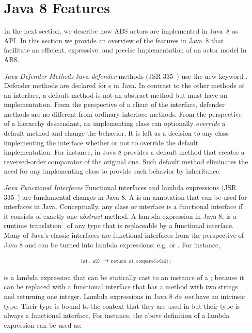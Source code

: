 \section{Java 8 Features}
\label{ch03:sec:j8:features}

In the next section, we describe how ABS actors are implemented in Java~8 as API.
In this section we provide an overview of the features in Java~8 that facilitate an efficient, expressive, and precise implementation of an actor model
in ABS.

\textsl{Java Defender Methods}
Java \emph{defender} methods (JSR 335~\cite{jsr335}) use the new keyword . 
Defender methods are declared for s in Java. 
In contrast to the other methods of an interface, a default method is not an abstract method but  must have an implementation.
From the perspective of a client of the interface, defender methods are no different from ordinary interface methods.
From the perspective of a hierarchy descendant, an implementing class can optionally \textit{override} a default method and change the behavior.
It is left as a decision to any class implementing the interface whether or not to override the default implementation.
For instance, in Java 8  provides a default method  that creates a reversed-order comparator of the original one.
Such default method eliminates the need for any implementing class to provide such behavior by inheritance.

\textsl{Java Functional Interfaces}
Functional interfaces and lambda expressions (JSR 335~\cite{jsr335}) are fundamental changes in Java 8. 
A  is an annotation that can be used for interfaces in Java.
Conceptually, any class or interface is a functional interface if it consists of exactly one \emph{abstract} method.
A lambda expression in Java 8, is a runtime translation~\cite{jsr335:lambda:translation} of any type that is replaceable by a functional interface.
Many of Java's classic interfaces are functional interfaces from the perspective of Java 8 and can be turned into lambda expressions; 
e.g.  or .
For instance,

$$
{\scriptsize\texttt{(s1, s2)}} \to {\scriptsize\texttt{return s1.compareTo(s2);}}
$$

is a lambda expression that can be statically cast to an instance of a ;
because it can be replaced with a functional interface that has a method with two strings and returning one integer.
Lambda expressions in Java 8 \emph{do not} have an intrinsic type.
Their type is bound to the context that they are used in but their type is always a functional interface.
For instance, the above definition of a lambda expression can be used as:

